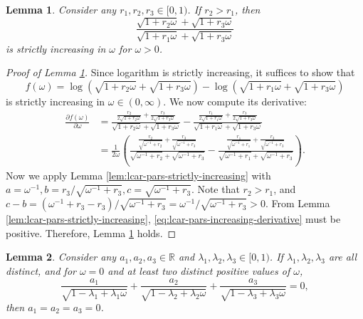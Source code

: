 \documentclass[11pt]{article}
\newtheorem{lemma}{Lemma}
\theoremstyle{definition}
\theoremstyle{remark}
\begin{document}
\begin{lemma}\label{lem:lcar-pars-strictly-increasing2}
Consider any $r_1,r_2,r_3 \in [0,1)$. If $r_2>r_1$, then 
\[\frac{\sqrt{1+r_2\omega} + \sqrt{1+r_3\omega}}{\sqrt{1+r_1\omega} + \sqrt{1+r_3\omega}}\]
is strictly increasing in $\omega$ for $\omega>0$.
\end{lemma}

\begin{proof}[Proof of Lemma \ref{lem:lcar-pars-strictly-increasing2}]
Since logarithm is strictly increasing, it suffices to show that
\[f(\omega) = \log(\sqrt{1+r_2\omega} + \sqrt{1+r_3 \omega}) - \log(\sqrt{1+r_1\omega} + \sqrt{1+r_3\omega})\] is strictly increasing in $\omega \in (0,\infty)$. We now compute its derivative: 
\begin{align}
\frac{\partial f(\omega)}{\partial \omega} &=\frac{\frac{r_2}{2\sqrt{1+r_2\omega}}+\frac{r_3}{2\sqrt{1+r_3\omega}}}{\sqrt{1+r_2\omega} + \sqrt{1+r_3 \omega}} - \frac{\frac{r_1}{2\sqrt{1+r_1\omega}}+\frac{r_3}{2\sqrt{1+r_3\omega}}}{\sqrt{1+r_1\omega} + \sqrt{1+r_3 \omega}} \nonumber\\ 
&= \frac{1}{2\omega} \left(\frac{\frac{r_2}{\sqrt{\omega^{-1}+r_2}} + \frac{r_3}{\sqrt{\omega^{-1}+r_3}}}{\sqrt{\omega^{-1}+r_2} + \sqrt{\omega^{-1}+r_3}} - \frac{\frac{r_1}{\sqrt{\omega^{-1}+r_1}} + \frac{r_3}{\sqrt{\omega^{-1}+r_3}}}{\sqrt{\omega^{-1}+r_1} + \sqrt{\omega^{-1}+r_3}} \right). \label{eq:lcar-pars-increasing-derivative}
\end{align}
Now we apply Lemma \ref{lem:lcar-pars-strictly-increasing} with $a=\omega^{-1}, b= r_3/\sqrt{\omega^{-1}+r_3}, c = \sqrt{\omega^{-1}+r_3}$. Note that $r_2 > r_1$, and  $c-b = (\omega^{-1}+r_3-r_3)/\sqrt{\omega^{-1}+r_3} = \omega^{-1}/\sqrt{\omega^{-1}+r_3} > 0$. 
From Lemma \ref{lem:lcar-pars-strictly-increasing}, \eqref{eq:lcar-pars-increasing-derivative} must be positive. 
Therefore, Lemma \ref{lem:lcar-pars-strictly-increasing2} holds. 
\end{proof}

\begin{lemma}\label{lem:lcar-pars-linind}
Consider any $a_1, a_2, a_3\in\mathbb{R}$ and $\lambda_1,\lambda_2,\lambda_3 \in [0,1)$. If $\lambda_1, \lambda_2,\lambda_3$ are all distinct, and for $\omega=0$ and at least two distinct positive values of $\omega$, 
\begin{equation}\label{eq:lcar-pars-linind}
\frac{a_1}{\sqrt{1-\lambda_1+\lambda_1\omega}} + \frac{a_2}{\sqrt{1-\lambda_2+\lambda_2\omega}} + \frac{a_3}{\sqrt{1-\lambda_3+\lambda_3\omega}} = 0,
\end{equation}
then $a_1=a_2=a_3=0$.
\end{lemma}
\end{document}
